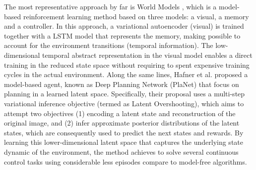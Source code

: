 The most representative approach by far is World Models \cite{ha2018world}, which is a model-based reinforcement learning method based on three models: a visual, a memory and a controller. In this approach, a variational autoencoder (visual) is trained together with a LSTM model that represents the memory, making possible to account for the environment transitions (temporal information). The low-dimensional temporal abstract representation in the visual model enables a direct training in the reduced state space without requiring to spent expensive training cycles in the actual environment. Along the same lines, Hafner et al. \cite{hafner2019learning} proposed a model-based agent, known as Deep Planning Network (PlaNet) that focus on planning in a learned latent space. Specifically, their proposal uses a multi-step variational inference objective (termed as Latent Overshooting), which aims to attempt two objectives (1) encoding a latent state and reconstruction of the original image, and (2) infer approximate posterior distributions of the latent states, which are consequently used to predict the next states and rewards. By learning this lower-dimensional latent space that captures the underlying state dynamic of the environment, the method achieves to solve several continuous control tasks using considerable less episodes compare to model-free algorithms.





 



